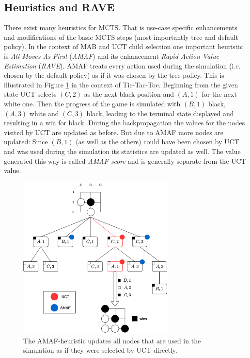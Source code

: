 \subsection{Heuristics and RAVE}
There exist many heuristics for MCTS. That is use-case specific enhancements and modifications of the basic MCTS steps (most importantly tree and default policy). In the context of MAB and UCT child selection one important heuristic is \textit{All Moves As First} (\textit{AMAF}) and its enhancement \textit{Rapid Action Value Estimation} (\textit{RAVE}). AMAF treats every action used during the simulation (i.e. chosen by the default policy) as if it was chosen by the tree policy. This is illustrated in Figure \ref{fig:amaf} in the context of Tic-Tac-Toe. Beginning from the given state UCT selects $(C,2)$ as the next black position and $(A,1)$ for the next white one. Then the progress of the game is simulated with $(B,1)$ black, $(A,3)$ white and $(C,3)$ black, leading to the terminal state displayed and resulting in a win for black. During the backpropagation the values for the nodes visited by UCT are updated as before. But due to AMAF more nodes are updated: Since $(B,1)$ (as well as the others) could have been chosen by UCT and was used during the simulation its statistics are updated as well. The value generated this way is called \textit{AMAF score} and is generally separate from the UCT value.
\begin{figure}
    \centering
    \includegraphics[width=0.7\textwidth]{img/amaf.png}
    \caption{The AMAF-heuristic updates all nodes that are used in the simulation as if they were selected by UCT directly.}
    \label{fig:amaf}
\end{figure}
